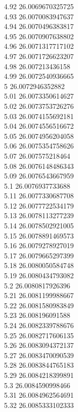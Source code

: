 {4.92	26.0069670325725\\
4.93	26.0070083947637\\
4.94	26.0070496383817\\
4.95	26.0070907638802\\
4.96	26.0071317717102\\
4.97	26.0071726623207\\
4.98	26.007213436158\\
4.99	26.0072540936665\\
5	26.0072946352882\\
5.01	26.0073350614627\\
5.02	26.0073753726276\\
5.03	26.0074155692181\\
5.04	26.0074556516672\\
5.05	26.0074956204058\\
5.06	26.0075354758626\\
5.07	26.007575218464\\
5.08	26.0076148486343\\
5.09	26.0076543667959\\
5.1	26.0076937733688\\
5.11	26.0077330687708\\
5.12	26.0077722534179\\
5.13	26.0078113277239\\
5.14	26.0078502921005\\
5.15	26.0078891469573\\
5.16	26.0079278927019\\
5.17	26.0079665297399\\
5.18	26.0080050584748\\
5.19	26.0080434793082\\
5.2	26.0080817926396\\
5.21	26.0081199988667\\
5.22	26.0081580983849\\
5.23	26.008196091588\\
5.24	26.0082339788676\\
5.25	26.0082717606135\\
5.26	26.0083094372137\\
5.27	26.0083470090539\\
5.28	26.0083844765183\\
5.29	26.0084218399891\\
5.3	26.0084590998466\\
5.31	26.0084962564691\\
5.32	26.0085333102333\\
}
